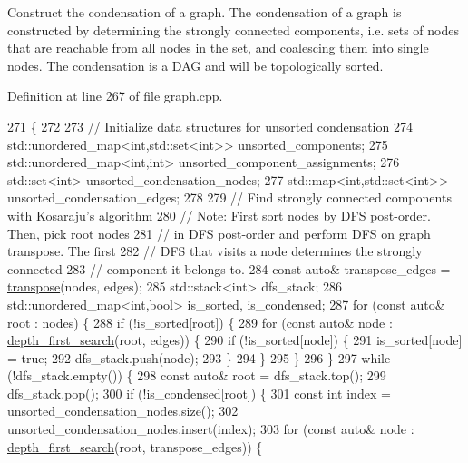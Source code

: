Construct the condensation of a graph. The condensation of a graph is constructed by determining the strongly connected components, i.\+e. sets of nodes that are reachable from all nodes in the set, and coalescing them into single nodes. The condensation is a D\+AG and will be topologically sorted. 

Definition at line 267 of file graph.\+cpp.


\begin{DoxyCode}
271                                                                \{
272 
273   \textcolor{comment}{// Initialize data structures for unsorted condensation}
274   std::unordered\_map<int,std::set<int>> unsorted\_components;
275   std::unordered\_map<int,int> unsorted\_component\_assignments;
276   std::set<int> unsorted\_condensation\_nodes;
277   std::map<int,std::set<int>> unsorted\_condensation\_edges;
278 
279   \textcolor{comment}{// Find strongly connected components with Kosaraju's algorithm}
280   \textcolor{comment}{// Note: First sort nodes by DFS post-order. Then, pick root nodes}
281   \textcolor{comment}{// in DFS post-order and perform DFS on graph transpose. The first}
282   \textcolor{comment}{// DFS that visits a node determines the strongly connected}
283   \textcolor{comment}{// component it belongs to.}
284   \textcolor{keyword}{const} \textcolor{keyword}{auto}& transpose\_edges = \hyperlink{namespacelbann_1_1graph_a53b0b97c3fc0b88f2fffd44f1b951c71}{transpose}(nodes, edges);
285   std::stack<int> dfs\_stack;
286   std::unordered\_map<int,bool> is\_sorted, is\_condensed;
287   \textcolor{keywordflow}{for} (\textcolor{keyword}{const} \textcolor{keyword}{auto}& root : nodes) \{
288     \textcolor{keywordflow}{if} (!is\_sorted[root]) \{
289       \textcolor{keywordflow}{for} (\textcolor{keyword}{const} \textcolor{keyword}{auto}& node : \hyperlink{namespacelbann_1_1graph_a44394207f3566604f867382b10aaf974}{depth\_first\_search}(root, edges)) \{
290         \textcolor{keywordflow}{if} (!is\_sorted[node]) \{
291           is\_sorted[node] = \textcolor{keyword}{true};
292           dfs\_stack.push(node);
293         \}
294       \}
295     \}
296   \}
297   \textcolor{keywordflow}{while} (!dfs\_stack.empty()) \{
298     \textcolor{keyword}{const} \textcolor{keyword}{auto}& root = dfs\_stack.top();
299     dfs\_stack.pop();
300     \textcolor{keywordflow}{if} (!is\_condensed[root]) \{
301       \textcolor{keyword}{const} \textcolor{keywordtype}{int} index = unsorted\_condensation\_nodes.size();
302       unsorted\_condensation\_nodes.insert(index);
303       \textcolor{keywordflow}{for} (\textcolor{keyword}{const} \textcolor{keyword}{auto}& node : \hyperlink{namespacelbann_1_1graph_a44394207f3566604f867382b10aaf974}{depth\_first\_search}(root, transpose\_edges)) \{

\end{DoxyCode}

